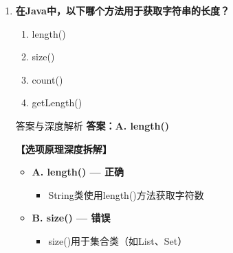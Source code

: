 \documentclass[12pt, a4paper]{ctexart}
\begin{document}
\begin{enumerate}[label=\textbf{\arabic*.}]
\begin{bluebox}{答案与深度解析}
\begin{itemize}[label={}, leftmargin=*, nosep]
\begin{itemize}[label={}, nosep]
			      \item toString()是将其他类型转为字符串，不是字符串转整数
		      

					  \end{itemize}
		      \item \textbf{D. toInteger() — 错误}
					  \begin{itemize}[label={}, nosep]
		      
			      \item 不存在此方法
		      

		      
					  \end{itemize}
					  \end{itemize}
\textbf{【应背诵知识点】}

		      parseInt返回int基本类型，valueOf返回Integer包装类
		      \end{bluebox}

	      \vspace{1em}

	\item \textbf{在Java中，以下哪个方法用于获取字符串的长度？}
	      \begin{enumerate}[label=\Alph*.]
		      \item length()
		      \item size()
		      \item count()
		      \item getLength()
	      \end{enumerate}

	      \begin{bluebox}{答案与深度解析}
		      \textbf{答案：A. length()}

		      \textbf{【选项原理深度拆解】}
					  \begin{itemize}[label={}, leftmargin=*, nosep]


		      \item \textbf{A. length() — 正确}
					  \begin{itemize}[label={}, nosep]
		      
			      \item String类使用length()方法获取字符数
		      

					  \end{itemize}
		      \item \textbf{B. size() — 错误}
					  \begin{itemize}[label={}, nosep]
		      
			      \item size()用于集合类（如List、Set）


\end{itemize}
\end{itemize}
\end{bluebox}
\end{enumerate}
\end{document}
